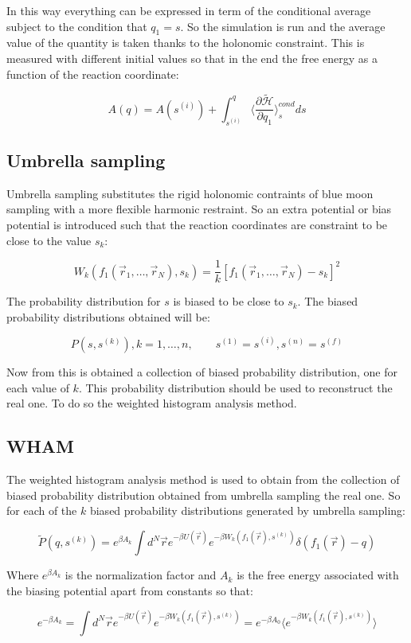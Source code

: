 	In this way everything can be expressed in term of the conditional average subject to the condition that $q_1=s$.
	So the simulation is run and the average value of the quantity is taken thanks to the holonomic constraint.
	This is measured with different initial values so that in the end the free energy as a function of the reaction coordinate:

	$$A(q) = A(s^{(i)}) + \int_{s^{(i)}}^q\biggl\langle\frac{\partial\tilde{\mathcal{H}}}{\partial q_1}\biggr\rangle^{cond}_sds$$

	\subsection{Umbrella sampling}
	Umbrella sampling substitutes the rigid holonomic contraints of blue moon sampling with a more flexible harmonic restraint.
	So an extra potential or bias potential is introduced such that the reaction coordinates are constraint to be close to the value $s_k$:

	$$W_k(f_1(\vec{r}_1, \dots, \vec{r}_N), s_k) = \frac{1}{k}[f_1(\vec{r}_1, \dots, \vec{r}_N)-s_k]^2$$

	The probability distribution for $s$ is biased to be close to $s_k$.
	The biased probability distributions obtained will be:

	$$P(s, s^{(k)}), k= 1, \dots, n,\qquad s^{(1)}=s^{(i)}, s^{(n)}=s^{(f)}$$

	Now from this is obtained a collection of biased probability distribution, one for each value of $k$.
	This probability distribution should be used to reconstruct the real one.
	To do so the weighted histogram analysis method.

	\subsection{WHAM}
	The weighted histogram analysis method is used to obtain from the collection of biased probability distribution obtained from umbrella sampling the real one.
	So for each of the $k$ biased probability distributions generated by umbrella sampling:

	$$\tilde{P}(q, s^{(k)}) = e^{\beta A_k}\int d^N\vec{r}e^{-\beta U(\vec{r})}e^{-\beta W_k(f_1(\vec{r}), s^{(k)})}\delta(f_1(\vec{r})-q)$$

	Where $e^{\beta A_k}$ is the normalization factor and $A_k$ is the free energy associated with the biasing potential apart from constants so that:

	$$e^{-\beta A_k} = \int d^N\vec{r}e^{-\beta U(\vec{r})}e^{-\beta W_k(f_1(\vec{r}), s^{(k)})}=e^{-\beta A_0}\biggl\langle e^{-\beta W_k(f_1(\vec{r}), s^{(k)})}\biggr\rangle$$

